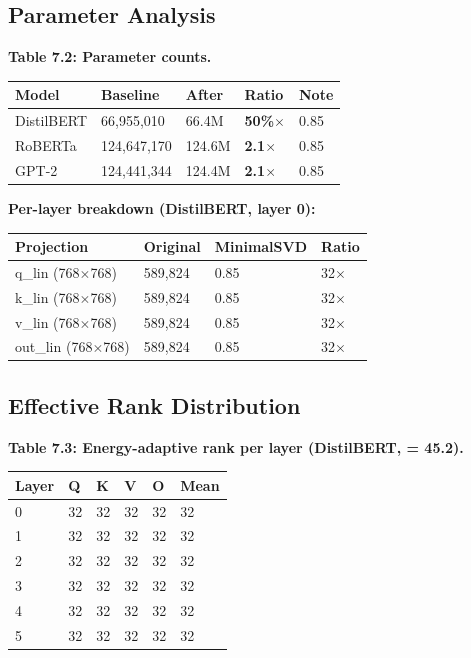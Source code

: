 \subsection{Parameter Analysis}

\textbf{Table 7.2: Parameter counts.}

\begin{table}[H]
\centering
\small
\begin{tabular}{lllll}
\toprule
\textbf{Model} & \textbf{Baseline} & \textbf{After} & \textbf{Ratio} & \textbf{Note} \\
\midrule
DistilBERT & 66,955,010 & 66.4M & \textbf{50\%$\times$} & 0.85 \\
RoBERTa & 124,647,170 & 124.6M & \textbf{2.1$\times$} & 0.85 \\
GPT-2 & 124,441,344 & 124.4M & \textbf{2.1$\times$} & 0.85 \\
\bottomrule
\end{tabular}
\end{table}

\textbf{Per-layer breakdown (DistilBERT, layer 0):}

\begin{table}[H]
\centering
\small
\begin{tabular}{llll}
\toprule
\textbf{Projection} & \textbf{Original} & \textbf{MinimalSVD} & \textbf{Ratio} \\
\midrule
q\_lin (768$\times$768) & 589,824 & 0.85 & 32$\times$ \\
k\_lin (768$\times$768) & 589,824 & 0.85 & 32$\times$ \\
v\_lin (768$\times$768) & 589,824 & 0.85 & 32$\times$ \\
out\_lin (768$\times$768) & 589,824 & 0.85 & 32$\times$ \\
\bottomrule
\end{tabular}
\end{table}

\subsection{Effective Rank Distribution}

\textbf{Table 7.3: Energy-adaptive rank per layer (DistilBERT,   = 45.2).}

\begin{table}[H]
\centering
\small
\begin{tabular}{llllll}
\toprule
\textbf{Layer} & \textbf{Q} & \textbf{K} & \textbf{V} & \textbf{O} & \textbf{Mean} \\
\midrule
0 & 32 & 32 & 32 & 32 & 32 \\
1 & 32 & 32 & 32 & 32 & 32 \\
2 & 32 & 32 & 32 & 32 & 32 \\
3 & 32 & 32 & 32 & 32 & 32 \\
4 & 32 & 32 & 32 & 32 & 32 \\
5 & 32 & 32 & 32 & 32 & 32 \\
\bottomrule
\end{tabular}
\end{table}

